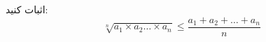 \begin{PROBLEM}
	\p
	اثبات کنید:
	$$\sqrt[n]{a_1 \times a_2 \dots \times a_n} \leq \frac{a_1 + a_2 + \dots + a_n}{n}$$
	\SOLUTION{
		\p
		
	}
\end{PROBLEM}